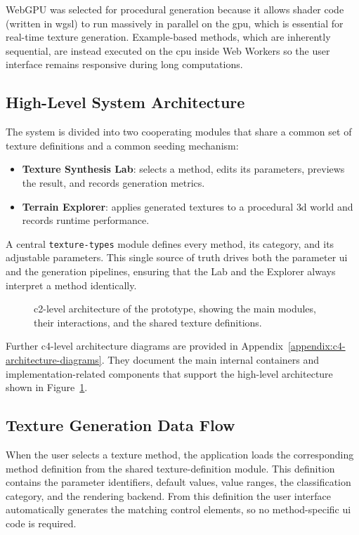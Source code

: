 WebGPU was selected for procedural generation because it allows shader code (written in \gls{wgsl}) to run massively in parallel on the \gls{gpu}, which is essential for real-time texture generation. Example-based methods, which are inherently sequential, are instead executed on the \gls{cpu} inside Web Workers so the user interface remains responsive during long computations.

\subsection{High-Level System Architecture}

The system is divided into two cooperating modules that share a common set of texture definitions and a common seeding mechanism:

\begin{itemize}[noitemsep, topsep=0pt]
    \item \textbf{Texture Synthesis Lab}: selects a method, edits its parameters, previews the result, and records generation metrics.
    \item \textbf{Terrain Explorer}: applies generated textures to a procedural \gls{3d} world and records runtime performance.
\end{itemize}

A central \texttt{texture-types} module defines every method, its category, and its adjustable parameters. This single source of truth drives both the parameter \gls{ui} and the generation pipelines, ensuring that the Lab and the Explorer always interpret a method identically.

\begin{figure}[H]
    \centering
    {\gls{c2}-level architecture of the prototype, showing the main modules, their interactions, and the shared texture definitions.}
    \label{fig:c2}
\end{figure}

Further \gls{c4}-level architecture diagrams are provided in Appendix~\ref{appendix:c4-architecture-diagrams}. They document the main internal containers and implementation-related components that support the high-level architecture shown in Figure~\ref{fig:c2}.

\subsection{Texture Generation Data Flow}

When the user selects a texture method, the application loads the corresponding method definition from the shared texture-definition module. This definition contains the parameter identifiers, default values, value ranges, the classification category, and the rendering backend. From this definition the user interface automatically generates the matching control elements, so no method-specific \gls{ui} code is required.

